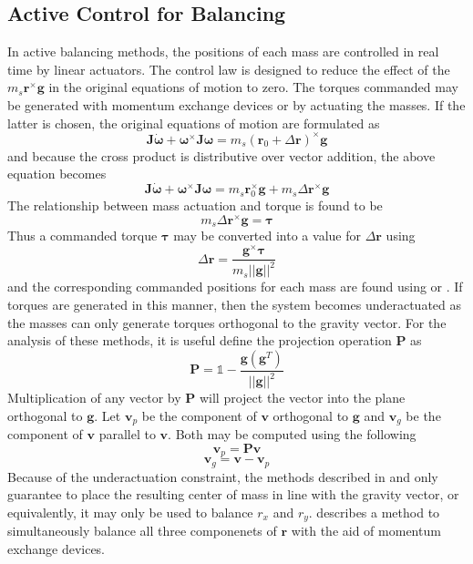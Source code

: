 \subsection{Active Control for Balancing}\label{sec:active_methods}

In active balancing methods, the positions of each mass are controlled in real time by linear actuators. The control law is designed to reduce the effect of the $m_s\bm{r}^{\times}\bm{g}$ in the original equations of motion to zero. The torques commanded may be generated with momentum exchange devices or by actuating the masses. If the latter is chosen, the original equations of motion are formulated as
\begin{equation} \label{equation:EomWithTau}
    \bm{J}\dot{\bm{\omega}} + \bm{\omega}^\times \bm{J\omega} 
    = m_s(\bm{r}_0+\Delta\bm{r})^{\times}\bm{g}
\end{equation}
and because the cross product is distributive over vector addition, the above equation becomes
\begin{equation} \label{equation:EomWithTau}
    \bm{J}\dot{\bm{\omega}} + \bm{\omega}^\times \bm{J\omega} 
    = m_s\bm{r}_0^{\times}\bm{g} + m_s\Delta\bm{r}^{\times}\bm{g}
\end{equation}
The relationship between mass actuation and torque is found to be
\begin{equation} 
    m_s\Delta\bm{r}^{\times}\bm{g} = \bm{\tau}
\end{equation}
Thus a commanded torque $\bm{\tau}$ may be converted into a value for $\Delta\bm{r}$ using
\begin{equation}\label{equation:torque_to_del_r}
    \Delta\bm{r}=\frac{\bm{g}^{\times}\bm{\tau}}{m_s||\bm{g}||^2}
\end{equation}
and the corresponding commanded positions for each mass are found using  or . If torques are generated in this manner, then the system becomes underactuated as the masses can only generate torques orthogonal to the gravity vector. For the analysis of these methods, it is useful define the projection operation $\bm{P}$ as
\begin{equation}
    \bm{P}=\mathbb{1}-\frac{\bm{g}(\bm{g}^T)}{||\bm{g}||^2}
\end{equation}
Multiplication of any vector by $\bm{P}$ will project the vector into the plane orthogonal to  $\bm{g}$. Let $\bm{v}_p$ be the component of $\bm{v}$ orthogonal to $\bm{g}$ and $\bm{v}_g$ be the component of $\bm{v}$ parallel to $\bm{v}$. Both may be computed using the following
\begin{equation}
    \bm{v}_p = \bm{Pv}
\end{equation}
\begin{equation}
    \bm{v}_g=\bm{v}-\bm{v}_p
\end{equation}
Because of the underactuation constraint, the methods described in  and  only guarantee to place the resulting center of mass in line with the gravity vector, or equivalently, it may only be used to balance $r_x$ and $r_y$.  describes a method to simultaneously balance all three componenets of $\bm{r}$ with the aid of momentum exchange devices. 

